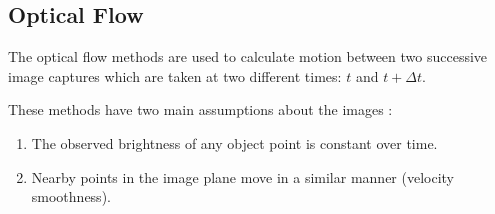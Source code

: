 \subsection{Optical Flow}

The optical flow methods are used to calculate motion between two successive image captures which are taken
 at two different times: $t$ and $t + \Delta t$.

These methods have two main assumptions about the images \cite{sonka2007}:

\begin{enumerate}
\item The observed brightness of any object point is constant over time.
\item Nearby points in the image plane move in a similar manner (velocity smoothness).
\end{enumerate}

